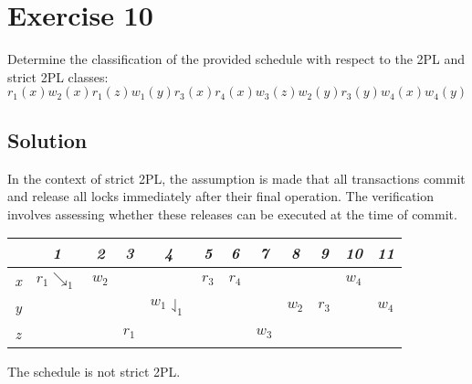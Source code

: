 \section{Exercise 10}

Determine the classification of the provided schedule with respect to the 2PL and strict 2PL classes:
\[r_1(x) w_2(x) r_1(z) w_1(y) r_3(x) r_4(x) w_3(z) w_2(y) r_3(y) w_4(x) w_4(y)\]

\subsection*{Solution}
In the context of strict 2PL, the assumption is made that all transactions commit and release all locks immediately after their final operation. 
The verification involves assessing whether these releases can be executed at the time of commit.
\begin{table}[H]
    \centering
    \begin{tabular}{c|ccccccccccc}
                & \textit{1} & \textit{2} & \textit{3} & \textit{4} & \textit{5} & \textit{6} & \textit{7} & \textit{8} & \textit{9} & \textit{10} & \textit{11}          \\ \hline
    \textit{x} & $r_1\searrow_1$       & $w_2$      &            &                                  & $r_3$      & $r_4$      &            &            &            & $w_4$       &                    \\
    \textit{y} &                       &            &            & $w_1\downharpoonleft_1$          &            &            &            & $w_2$      & $r_3$      &             & $w_4$                \\
    \textit{z} &                       &            & $r_1$      &                                  &            &            & $w_3$      &            &            &             &                     
    \end{tabular}%
\end{table}
The schedule is not strict 2PL.

